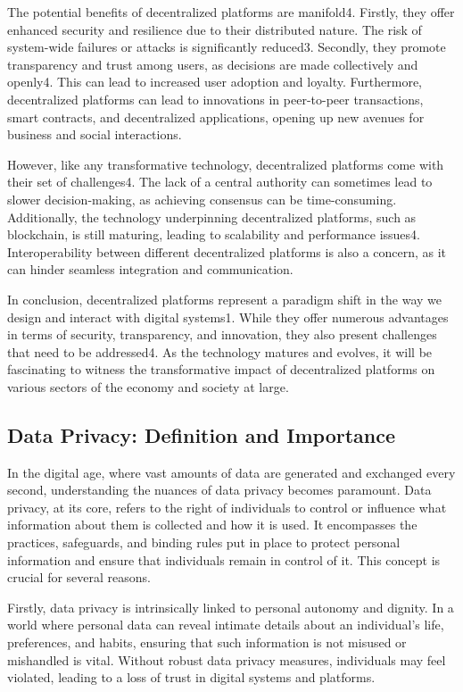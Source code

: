 The potential benefits of decentralized platforms are manifold4. Firstly, they offer enhanced security and resilience due to their distributed nature. The risk of system-wide failures or attacks is significantly reduced3. Secondly, they promote transparency and trust among users, as decisions are made collectively and openly4. This can lead to increased user adoption and loyalty. Furthermore, decentralized platforms can lead to innovations in peer-to-peer transactions, smart contracts, and decentralized applications, opening up new avenues for business and social interactions.

However, like any transformative technology, decentralized platforms come with their set of challenges4. The lack of a central authority can sometimes lead to slower decision-making, as achieving consensus can be time-consuming. Additionally, the technology underpinning decentralized platforms, such as blockchain, is still maturing, leading to scalability and performance issues4. Interoperability between different decentralized platforms is also a concern, as it can hinder seamless integration and communication.

In conclusion, decentralized platforms represent a paradigm shift in the way we design and interact with digital systems1. While they offer numerous advantages in terms of security, transparency, and innovation, they also present challenges that need to be addressed4. As the technology matures and evolves, it will be fascinating to witness the transformative impact of decentralized platforms on various sectors of the economy and society at large.


\subsection{Data Privacy: Definition and Importance}
In the digital age, where vast amounts of data are generated and exchanged every second, understanding the nuances of data privacy becomes paramount. Data privacy, at its core, refers to the right of individuals to control or influence what information about them is collected and how it is used. It encompasses the practices, safeguards, and binding rules put in place to protect personal information and ensure that individuals remain in control of it. This concept is crucial for several reasons.

Firstly, data privacy is intrinsically linked to personal autonomy and dignity. In a world where personal data can reveal intimate details about an individual's life, preferences, and habits, ensuring that such information is not misused or mishandled is vital. Without robust data privacy measures, individuals may feel violated, leading to a loss of trust in digital systems and platforms.

